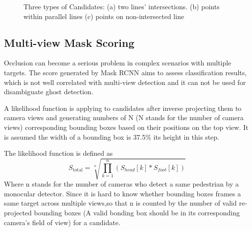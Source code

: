 \documentclass[journal]{IEEEtran}
\begin{document}
\begin{figure} 
    \centering
    \hfill
    \hfill
  \caption{Three types of Candidates: (a) two lines' intersections. (b) points within parallel lines (c) points on non-intersected line}
  \label{candiates} 
\end{figure}


\subsection{Multi-view Mask Scoring}
Occlusion can become a serious problem in complex scenarios with multiple  targets. The score generated by Mask RCNN aims to assess classification results, which is not well correlated with multi-view detection and it can not be used for disambiguate ghost detection.

A likelihood function is applying to candidates after inverse projecting them to camera views and generating numbers of N (N stands for the number of camera views) corresponding bounding boxes based on their positions on the top view. It is assumed the width of a bounding box is 37.5\% its height in this step.

The likelihood function is defined as 
$$
    S_{\text {total}}=\sqrt[n]{\prod_{k=1}^{n}\left(S_{h e a d}[k]*S_{f o o t}[k]\right)}
$$
Where n stands for the number of cameras who detect a same pedestrian by a monocular detector. Since it is hard to know whether bounding boxes frames a same target across multiple views,so  that n is counted by the number of valid re-projected bounding boxes (A valid bonding box should be in its corresponding camera's field of view) for a candidate. 
\end{document}
